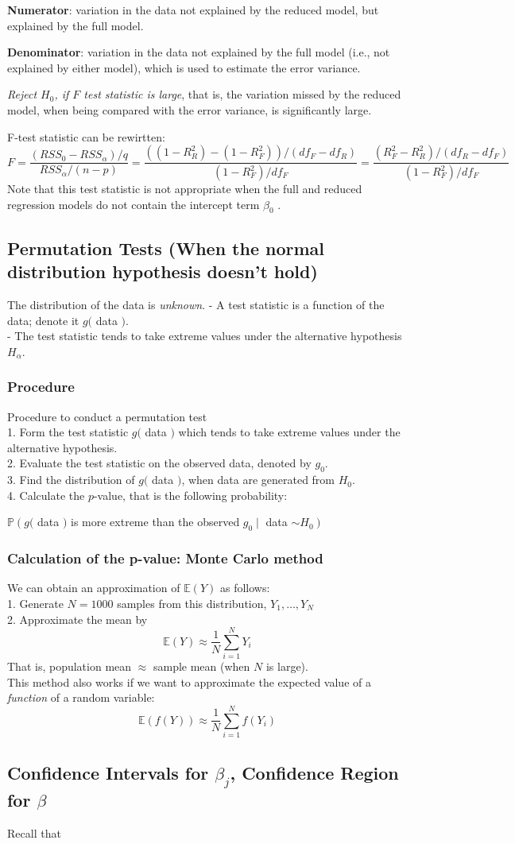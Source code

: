 \documentclass[11pt,a4paper]{article}
\begin{document}
\textbf{Numerator}: variation in the data not explained by the reduced model, but explained by the full model.

\textbf{Denominator}: variation in the data not explained by the full model (i.e., not explained by either model), which is used to estimate the error variance.

\textit{Reject $H_{0}$, if $F$ test statistic is large}, that is, the variation missed by the reduced model, when being compared with the error variance, is significantly large.

F-test statistic can be rewirtten:
$$F=\frac{\left(R S S_{0}-R S S_{\alpha}\right) / q}{R S S_{\alpha} /(n-p)}=\frac{((1-R_R^2)-(1-R_F^2))/(df_F-df_R)}{(1-R_F^2)/df_F}=\frac{(R_F^2-R_R^2)/(df_R-df_F)}{(1-R_F^2)/df_F}$$
Note that this test statistic is not appropriate when the full and reduced regression models do not contain the intercept term $\beta_0$ .

\subsection{Permutation Tests (When the normal distribution hypothesis doesn't hold)}
The distribution of the data is \textit{unknown}.
- A test statistic is a function of the data; denote it $g($ data $)$.\\
- The test statistic tends to take extreme values under the alternative hypothesis $H_{\alpha}$.
\subsubsection{Procedure}
Procedure to conduct a permutation test\\
1. Form the test statistic $g($ data $)$ which tends to take extreme values under the alternative hypothesis.\\
2. Evaluate the test statistic on the observed data, denoted by $g_{0}$.\\
3. Find the distribution of $g($ data $)$, when data are generated from $H_{0}$.\\
4. Calculate the $p$-value, that is the following probability:
\begin{center}
    $\mathbb{P}\left(g(\right.$ data $)$ is more extreme than the observed $g_{0} \mid$ data $\left.\sim H_{0}\right)$
\end{center}

\subsubsection{Calculation of the p-value: Monte Carlo method}
We can obtain an approximation of $\mathbb{E}(Y)$ as follows:\\
1. Generate $N=1000$ samples from this distribution, $Y_{1}, \ldots, Y_{N}$\\
2. Approximate the mean by
$$
\mathbb{E}(Y) \approx \frac{1}{N} \sum_{i=1}^{N} Y_{i}
$$
That is, population mean $\approx$ sample mean (when $N$ is large).\\

This method also works if we want to approximate the expected value of a \textit{function} of a random variable:
$$
\mathbb{E}(f(Y)) \approx \frac{1}{N} \sum_{i=1}^{N} f\left(Y_{i}\right)
$$

\subsection{Confidence Intervals for $\beta_j$, Confidence Region for $\beta$}
Recall that
$$$$
\end{document}
